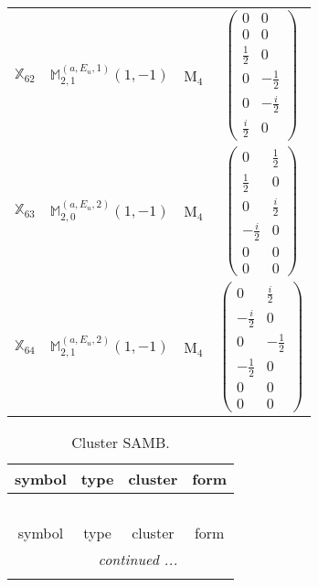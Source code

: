 \documentclass[fleqn,10pt,landscape]{article}
\begin{document}
\begin{itemize}
\begin{center}
\begin{longtable}{c|c|c|c}
$ \mathbb{X}_{62} $ & $\mathbb{M}_{2,1}^{(a,E_{u},1)}(1,-1)$ & M$_{4}$ & $\begin{pmatrix} 0 & 0 \\ 0 & 0 \\ \frac{1}{2} & 0 \\ 0 & - \frac{1}{2} \\ 0 & - \frac{i}{2} \\ \frac{i}{2} & 0 \end{pmatrix}$ \\
$ \mathbb{X}_{63} $ & $\mathbb{M}_{2,0}^{(a,E_{u},2)}(1,-1)$ & M$_{4}$ & $\begin{pmatrix} 0 & \frac{1}{2} \\ \frac{1}{2} & 0 \\ 0 & \frac{i}{2} \\ - \frac{i}{2} & 0 \\ 0 & 0 \\ 0 & 0 \end{pmatrix}$ \\
$ \mathbb{X}_{64} $ & $\mathbb{M}_{2,1}^{(a,E_{u},2)}(1,-1)$ & M$_{4}$ & $\begin{pmatrix} 0 & \frac{i}{2} \\ - \frac{i}{2} & 0 \\ 0 & - \frac{1}{2} \\ - \frac{1}{2} & 0 \\ 0 & 0 \\ 0 & 0 \end{pmatrix}$ \\
\end{longtable}
\end{center}
\begin{center}
\renewcommand{\arraystretch}{1.3}
\begin{longtable}{c|c|c|c}
\caption{Cluster SAMB.}
 \\
 \hline \hline
symbol & type & cluster & form \\ \hline \endfirsthead

\multicolumn{3}{l}{\tablename\ \thetable{}} \\
 \hline \hline
symbol & type & cluster & form \\ \hline \endhead

 \hline \hline
\multicolumn{3}{r}{\footnotesize\it continued ...} \\ \endfoot


\end{longtable}
\end{center}
\end{itemize}
\end{document}
